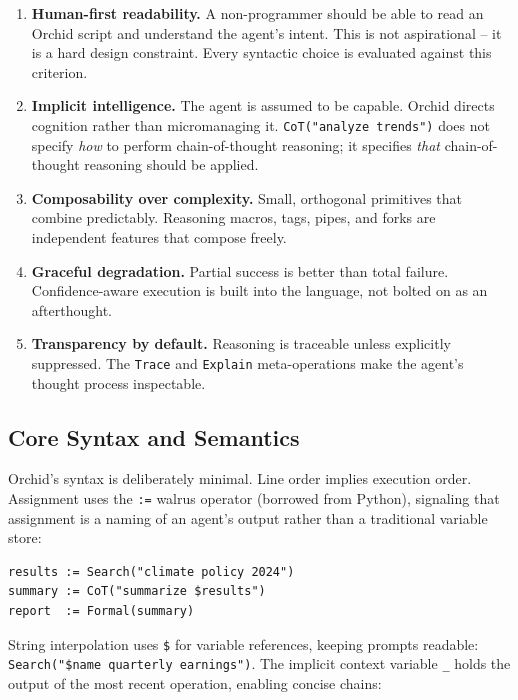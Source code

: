 \documentclass[11pt,a4paper]{article}
\begin{document}
\begin{enumerate}[leftmargin=*]
  \item \textbf{Human-first readability.} A non-programmer should be able to read an Orchid script and understand the agent's intent. This is not aspirational -- it is a hard design constraint. Every syntactic choice is evaluated against this criterion.

  \item \textbf{Implicit intelligence.} The agent is assumed to be capable. Orchid directs cognition rather than micromanaging it. \texttt{CoT("analyze trends")} does not specify \emph{how} to perform chain-of-thought reasoning; it specifies \emph{that} chain-of-thought reasoning should be applied.

  \item \textbf{Composability over complexity.} Small, orthogonal primitives that combine predictably. Reasoning macros, tags, pipes, and forks are independent features that compose freely.

  \item \textbf{Graceful degradation.} Partial success is better than total failure. Confidence-aware execution is built into the language, not bolted on as an afterthought.

  \item \textbf{Transparency by default.} Reasoning is traceable unless explicitly suppressed. The \texttt{Trace} and \texttt{Explain} meta-operations make the agent's thought process inspectable.
\end{enumerate}

\subsection{Core Syntax and Semantics}

Orchid's syntax is deliberately minimal. Line order implies execution order. Assignment uses the \texttt{:=} walrus operator (borrowed from Python), signaling that assignment is a naming of an agent's output rather than a traditional variable store:

\begin{lstlisting}[language=orchid]
results := Search("climate policy 2024")
summary := CoT("summarize $results")
report  := Formal(summary)
\end{lstlisting}

String interpolation uses \texttt{\$} for variable references, keeping prompts readable: \texttt{Search("\$name quarterly earnings")}. The implicit context variable \texttt{\_} holds the output of the most recent operation, enabling concise chains:
\end{document}
